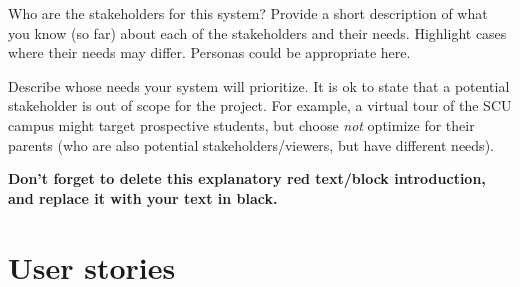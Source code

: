 \begin{tcolorbox}[      %
    boxrule=0pt,        %
    colback=white,      %
    coltext=red         %
]                       %
    Who are the stakeholders for this system? Provide a short description of what you know (so far) about each of the stakeholders and their needs. Highlight cases where their needs may differ. Personas could be appropriate here.
    
    Describe whose needs your system will prioritize. It is ok to state that a potential stakeholder is out of scope for the project. For example, a virtual tour of the SCU campus might target prospective students, but choose \textit{not} optimize for their parents (who are also potential stakeholders/viewers, but have different needs).

    \vspace{15pt}       %
    \begin{center}      %
    \textbf{Don't forget to delete this explanatory red text/block introduction, and replace it with your text in black.}
    \end{center}        %
\end{tcolorbox}         %

\section{User stories} %

